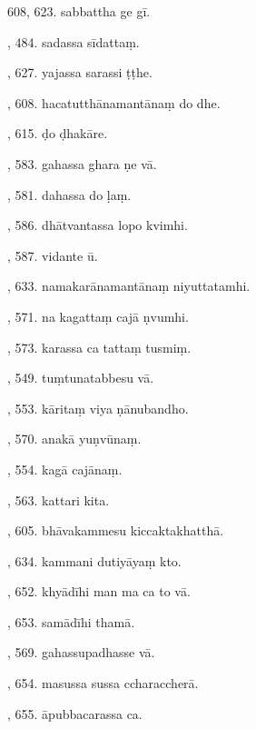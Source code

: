 608, 623. sabbattha ge gī.\hfill \pageref{sut:608}\par {}, 484. sadassa sīdattaṃ.\hfill \pageref{sut:609}\par {}, 627. yajassa sarassi ṭṭhe.\hfill \pageref{sut:610}\par {}, 608. hacatutthānamantānaṃ do dhe.\hfill \pageref{sut:611}\par {}, 615. ḍo ḍhakāre.\hfill \pageref{sut:612}\par {}, 583. gahassa ghara ṇe vā.\hfill \pageref{sut:613}\par {}, 581. dahassa do ḷaṃ.\hfill \pageref{sut:614}\par {}, 586. dhātvantassa lopo kvimhi.\hfill \pageref{sut:615}\par {}, 587. vidante ū.\hfill \pageref{sut:616}\par {}, 633. namakarānamantānaṃ niyuttatamhi.\hfill \pageref{sut:617}\par {}, 571. na kagattaṃ cajā ṇvumhi.\hfill \pageref{sut:618}\par {}, 573. karassa ca tattaṃ tusmiṃ.\hfill \pageref{sut:619}\par {}, 549. tuṃtunatabbesu vā.\hfill \pageref{sut:620}\par {}, 553. kāritaṃ viya ṇānubandho.\hfill \pageref{sut:621}\par {}, 570. anakā yuṇvūnaṃ.\hfill \pageref{sut:622}\par {}, 554. kagā cajānaṃ.\hfill \pageref{sut:623}\par {}, 563. kattari kita.\hfill \pageref{sut:624}\par {}, 605. bhāvakammesu kiccaktakhatthā.\hfill \pageref{sut:625}\par {}, 634. kammani dutiyāyaṃ kto.\hfill \pageref{sut:626}\par {}, 652. khyādīhi man ma ca to vā.\hfill \pageref{sut:627}\par {}, 653. samādīhi thamā.\hfill \pageref{sut:628}\par {}, 569. gahassupadhasse vā.\hfill \pageref{sut:629}\par {}, 654. masussa sussa ccharaccherā.\hfill \pageref{sut:630}\par {}, 655. āpubbacarassa ca.\hfill \pageref{sut:631}\par \noindent
